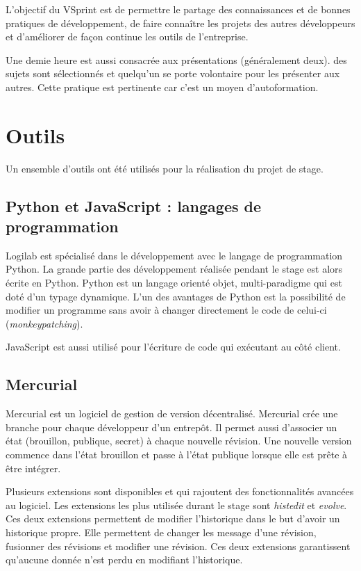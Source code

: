 L'objectif du VSprint est de permettre le partage des connaissances et de bonnes pratiques de développement, de faire connaître les projets des autres développeurs et d'améliorer de façon continue les outils de l'entreprise. 

Une demie heure est aussi consacrée aux présentations (généralement deux). des sujets sont sélectionnés et quelqu'un se porte volontaire pour les présenter aux autres. Cette pratique est pertinente car c'est un moyen d'autoformation.


\section{Outils}
Un ensemble d'outils ont été utilisés pour la réalisation du projet de stage. 

\subsection{Python et JavaScript : langages de programmation}
Logilab est spécialisé dans le développement avec le langage de programmation Python. La grande partie des développement réalisée pendant le stage est alors écrite en Python. Python est un langage orienté objet, multi-paradigme qui est doté d'un typage dynamique. L'un des avantages de Python est la possibilité de modifier un programme sans avoir à changer directement le code de celui-ci (\textit{monkeypatching}).

JavaScript est aussi utilisé pour l'écriture de code qui exécutant au côté client. 

\subsection{Mercurial}
Mercurial est un logiciel de gestion de version décentralisé. Mercurial crée une branche pour chaque développeur d'un entrepôt. Il permet aussi d'associer un état (brouillon, publique, secret) à chaque nouvelle révision. Une nouvelle version commence dans l'état brouillon et passe à l'état publique lorsque elle est prête à être intégrer. 

Plusieurs extensions sont disponibles et qui rajoutent des fonctionnalités avancées au logiciel. Les extensions les plus utilisée durant le stage sont \textit{histedit} et \textit{evolve}. Ces deux extensions permettent de modifier l'historique dans le but d'avoir un historique propre. Elle permettent de changer les message d'une révision, fusionner des révisions et modifier une révision. Ces deux extensions garantissent qu'aucune donnée n'est perdu en modifiant l'historique. 

